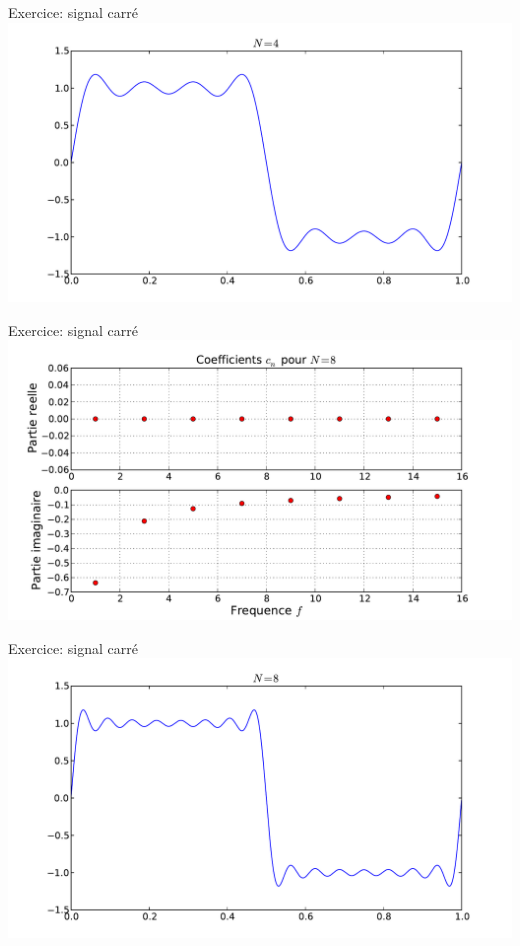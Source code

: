 \documentclass[8pt,a4paper]{beamer}
\begin{document}
\begin{frame}{Exercice: signal carré}
\includegraphics[width=1.\textwidth]{figures/serieF_carre_4.pdf}\\
\end{frame}


\begin{frame}{Exercice: signal carré}
\includegraphics[width=1.\textwidth]{figures/serieF_carre_c_8.pdf} \\
\end{frame}

\begin{frame}{Exercice: signal carré}
\includegraphics[width=1.\textwidth]{figures/serieF_carre_8.pdf}\\
\end{frame}
\end{document}
